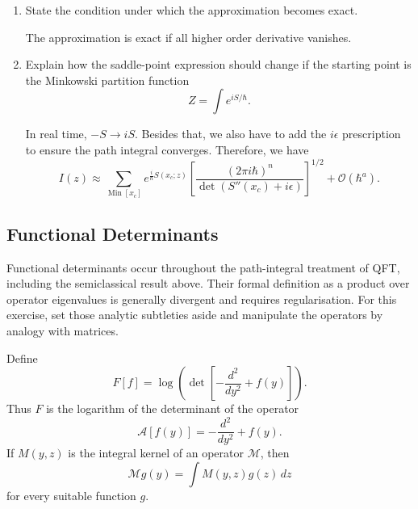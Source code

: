 \begin{enumerate}[label=\alph*)]
    \item State the condition under which the approximation becomes exact.
    \begin{solution}
        The approximation is exact if all higher order derivative vanishes.
    \end{solution}

    \item Explain how the saddle-point expression should change if the starting
    point is the Minkowski partition function
    \begin{equation}
        Z=\int e^{iS/\hbar}.
    \end{equation}
    \begin{solution}
        In real time, $-S \to iS$. Besides that, we also have to add the $i\epsilon$ prescription to ensure the path integral converges. Therefore, we have
        \begin{equation}
            I(z)\approx
        \sum_{\operatorname{Min}[x_c]}
        e^{\frac{i}{\hbar}S(x_c;z)}
        \left[
            \frac{(2\pi i\hbar)^n}{\det (S''(x_c) + i\epsilon)}
        \right]^{1/2}
        +\mathcal O(\hbar^a).
        \end{equation}
    \end{solution}
\end{enumerate}

\subsection{Functional Determinants}

Functional determinants occur throughout the path-integral treatment of QFT,
including the semiclassical result above. Their formal definition as a product
over operator eigenvalues is generally divergent and requires regularisation.
For this exercise, set those analytic subtleties aside and manipulate the
operators by analogy with matrices.

Define
\begin{equation}
    F[f]
    =\log\!\left(
        \det\!\left[-\frac{d^2}{dy^2}+f(y)\right]
    \right).
\end{equation}
Thus $F$ is the logarithm of the determinant of the operator
\begin{equation}
    \mathcal A[f(y)]
    =-\frac{d^2}{dy^2}+f(y).
\end{equation}
If $M(y,z)$ is the integral kernel of an operator $\mathcal M$, then
\begin{equation}
    \mathcal M g(y)
    =\int M(y,z)g(z)\,dz
\end{equation}
for every suitable function $g$.

